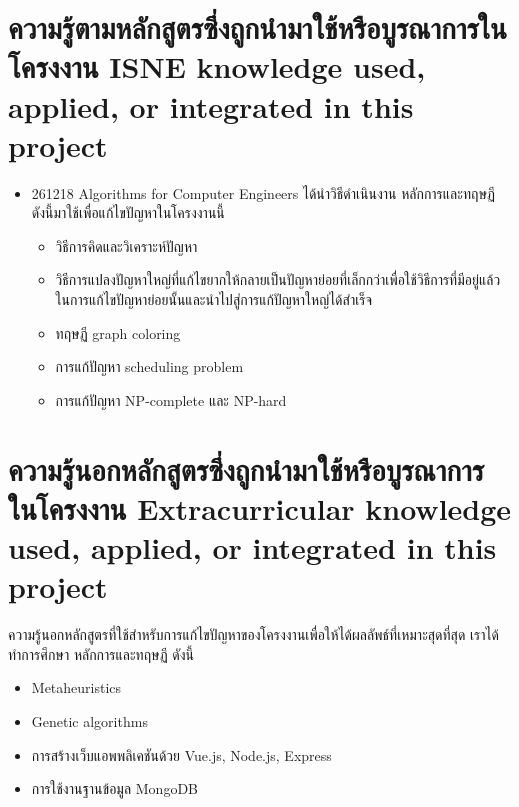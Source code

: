 \section{\ifcpe%
ความรู้ตามหลักสูตรซึ่งถูกนำมาใช้หรือบูรณาการในโครงงาน
\else%
ISNE knowledge used, applied, or integrated in this project
\fi
}
\begin{itemize}
  \item 261218 Algorithms for Computer Engineers ได้นำวิธีดำเนินงาน หลักการและทฤษฏี ดังนี้มาใช้เพื่อแก้ไขปัญหาในโครงงานนี้  
  \begin{itemize}
  \item วิธีการคิดและวิเคราะห์ปัญหา
  \item วิธีการแปลงปัญหาใหญ่ที่แก้ไขยากให้กลายเป็นปัญหาย่อยที่เล็กกว่าเพื่อใช้วิธีการที่มีอยู่แล้วในการแก้ไขปัญหาย่อยนั้นและนำไปสู่การแก้ปัญหาใหญ่ได้สำเร็จ
  \item ทฤษฏี graph coloring
  \item การแก้ปัญหา scheduling problem
  \item การแก้ปัญหา NP-complete และ NP-hard
  \end{itemize}
\end{itemize}

\section{\ifcpe%
ความรู้นอกหลักสูตรซึ่งถูกนำมาใช้หรือบูรณาการในโครงงาน
\else%
Extracurricular knowledge used, applied, or integrated in this project
\fi
}
ความรู้นอกหลักสูตรที่ใช้สำหรับการแก้ไขปัญหาของโครงงานเพื่อให้ได้ผลลัพธ์ที่เหมาะสุดที่สุด เราได้ทำการศึกษา หลักการและทฤษฏี ดังนี้
\begin{itemize}
  \item Meta­heuristics
  \item Genetic algorithms
  \item การสร้างเว็บแอพพลิเคชันด้วย Vue.js, Node.js, Express
  \item การใช้งานฐานข้อมูล MongoDB
\end{itemize}

